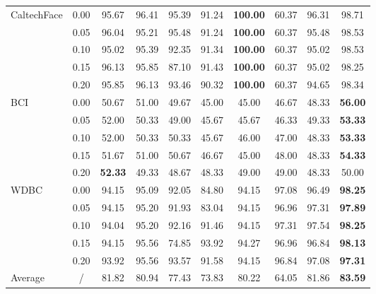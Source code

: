 \documentclass[sn-mathphys]{JORSC-jnl}%
\theoremstyle{thmstyleone}%
\theoremstyle{thmstylethree}%
\theoremstyle{thmstyleone} %
\begin{document}
\begin{table}[t]
\begin{adjustbox}{width=\textwidth}
\begin{tabular}{lccccccccc}
\multirow{5}{*}{CaltechFace}
& 0.00 & 95.67 & 96.41 & 95.39 & 91.24 & \textbf{100.00} & 60.37 & 96.31 & 98.71 \\
& 0.05 & 96.04 & 95.21 & 95.48 & 91.24 & \textbf{100.00} & 60.37 & 95.48 & 98.53 \\
& 0.10 & 95.02 & 95.39 & 92.35 & 91.34 & \textbf{100.00} & 60.37 & 95.02 & 98.53 \\
& 0.15 & 96.13 & 95.85 & 87.10 & 91.43 & \textbf{100.00} & 60.37 & 95.02 & 98.25 \\
& 0.20 & 95.85 & 96.13 & 93.46 & 90.32 & \textbf{100.00} & 60.37 & 94.65 & 98.34 \\
\midrule  

\multirow{5}{*}{BCI}
& 0.00 & 50.67 & 51.00 & 49.67 & 45.00 & 45.00 & 46.67 & 48.33 & \textbf{56.00} \\
& 0.05 & 52.00 & 50.33 & 49.00 & 45.67 & 45.67 & 46.33 & 49.33 & \textbf{53.33} \\
& 0.10 & 52.00 & 50.33 & 50.33 & 45.67 & 46.00 & 47.00 & 48.33 & \textbf{53.33} \\
& 0.15 & 51.67 & 51.00 & 50.67 & 46.67 & 45.00 & 48.00 & 48.33 & \textbf{54.33} \\
& 0.20 & \textbf{52.33} & 49.33 & 48.67 & 48.33 & 49.00 & 49.00 & 48.33 & 50.00 \\
\midrule  

\multirow{5}{*}{WDBC}
& 0.00 & 94.15 & 95.09 & 92.05 & 84.80 & 94.15 & 97.08 & 96.49 & \textbf{98.25} \\
& 0.05 & 94.15 & 95.20 & 91.93 & 83.04 & 94.15 & 96.96 & 97.31 & \textbf{97.89} \\
& 0.10 & 94.04 & 95.20 & 92.16 & 91.46 & 94.15 & 97.31 & 97.54 & \textbf{98.25} \\
& 0.15 & 94.15 & 95.56 & 74.85 & 93.92 & 94.27 & 96.96 & 96.84 & \textbf{98.13} \\
& 0.20 & 93.92 & 95.56 & 93.57 & 91.58 & 94.15 & 96.84 & 97.08 & \textbf{97.31} \\
\midrule  

Average & / & 81.82 & 80.94 & 77.43 & 73.83 & 80.22 & 64.05 & 81.86 & \textbf{83.59} \\
\bottomrule  
\end{tabular}
\end{adjustbox}
\end{table}
\end{document}
